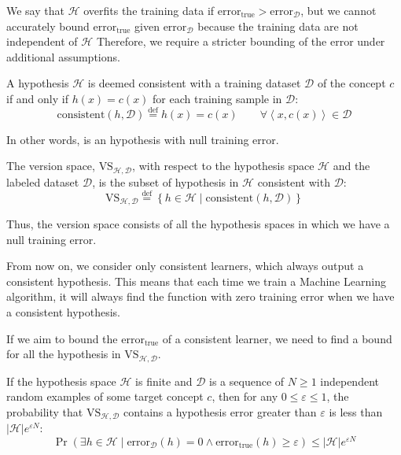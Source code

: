 We say that $\mathcal{H}$ overfits the training data if $\text{error}_{\text{true}}>\text{error}_{\mathcal{D}}$, but we cannot accurately bound $\text{error}_{\text{true}}$ given $\text{error}_{\mathcal{D}}$ because the training data are not independent of $\mathcal{H}$
Therefore, we require a stricter bounding of the error under additional assumptions.

\begin{definition}
    A hypothesis $\mathcal{H}$ is deemed consistent with a training dataset $\mathcal{D}$ of the concept $c$ if and only if $h(x) = c(x)$ for each training sample in $\mathcal{D}$: 
    \[\text{consistent}(h,\mathcal{D})\overset{\text{def}}{=}h(x)=c(x)\qquad\forall\left\langle x,c(x) \right\rangle\in\mathcal{D}\]
\end{definition}
In other words, is an hypothesis with null training error.
\begin{definition}
    The version space, $\text{VS}_{\mathcal{H},\mathcal{D}}$, with respect to the hypothesis space $\mathcal{H}$ and the labeled dataset $\mathcal{D}$, is the subset of hypothesis in $\mathcal{H}$ consistent with $\mathcal{D}$: 
    \[\text{VS}_{\mathcal{H},\mathcal{D}}\overset{\text{def}}{=}\left\{h\in \mathcal{H}\mid\text{consistent}(h,\mathcal{D})\right\}\]
\end{definition}
Thus, the version space consists of all the hypothesis spaces in which we have a null training error. 

From now on, we consider only consistent learners, which always output a consistent hypothesis.
This means that each time we train a Machine Learning algorithm, it will always find the function with zero training error when we have a consistent hypothesis. 

If we aim to bound the $\text{error}_{\text{true}}$ of a consistent learner, we need to find a bound for all the hypothesis in $\text{VS}_{\mathcal{H},\mathcal{D}}$. 
\begin{theorem}
    If the hypothesis space $\mathcal{H}$ is finite and $\mathcal{D}$ is a sequence of $N\geq 1$ independent random examples of some target concept $c$, then for any $0\leq\varepsilon\leq 1$, the probability that $\text{VS}_{\mathcal{H},\mathcal{D}}$ contains a hypothesis error greater than $\varepsilon$ is less than $\left\lvert \mathcal{H}\right\rvert e^{\varepsilon N}$: 
    \[\Pr(\exists h \in \mathcal{H}\mid\text{error}_{\mathcal{D}}(h)=0\land \text{error}_{\text{true}}(h)\geq\varepsilon)\leq \left\lvert \mathcal{H}\right\rvert e^{\varepsilon N}\]
\end{theorem}

